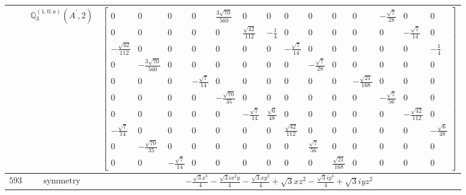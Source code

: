 \documentclass[fleqn,8pt,landscape]{jsarticle}
\begin{document}
\begin{longtable}{ccc}
$  $ & $ \mathbb{Q}_{3}^{(1,0;a)}(A^{\prime},2) $ & $ \begin{bmatrix} 0 & 0 & 0 & 0 & \frac{3 \sqrt{70}}{560} & 0 & 0 & 0 & 0 & 0 & 0 & - \frac{\sqrt{7}}{28} & 0 & 0 \\ 0 & 0 & 0 & 0 & 0 & \frac{\sqrt{42}}{112} & - \frac{1}{4} & 0 & 0 & 0 & 0 & 0 & - \frac{\sqrt{7}}{14} & 0 \\ - \frac{\sqrt{42}}{112} & 0 & 0 & 0 & 0 & 0 & 0 & - \frac{\sqrt{7}}{14} & 0 & 0 & 0 & 0 & 0 & - \frac{1}{4} \\ 0 & - \frac{3 \sqrt{70}}{560} & 0 & 0 & 0 & 0 & 0 & 0 & - \frac{\sqrt{7}}{28} & 0 & 0 & 0 & 0 & 0 \\ 0 & 0 & 0 & - \frac{\sqrt{7}}{14} & 0 & 0 & 0 & 0 & 0 & 0 & - \frac{\sqrt{21}}{168} & 0 & 0 & 0 \\ 0 & 0 & 0 & 0 & - \frac{\sqrt{70}}{35} & 0 & 0 & 0 & 0 & 0 & 0 & - \frac{\sqrt{7}}{56} & 0 & 0 \\ 0 & 0 & 0 & 0 & 0 & - \frac{\sqrt{7}}{14} & \frac{\sqrt{6}}{48} & 0 & 0 & 0 & 0 & 0 & - \frac{\sqrt{42}}{112} & 0 \\ - \frac{\sqrt{7}}{14} & 0 & 0 & 0 & 0 & 0 & 0 & \frac{\sqrt{42}}{112} & 0 & 0 & 0 & 0 & 0 & - \frac{\sqrt{6}}{48} \\ 0 & - \frac{\sqrt{70}}{35} & 0 & 0 & 0 & 0 & 0 & 0 & \frac{\sqrt{7}}{56} & 0 & 0 & 0 & 0 & 0 \\ 0 & 0 & - \frac{\sqrt{7}}{14} & 0 & 0 & 0 & 0 & 0 & 0 & \frac{\sqrt{21}}{168} & 0 & 0 & 0 & 0 \end{bmatrix} $ \\ \hline
$ 593 $ & $ \text{symmetry} $ & $ - \frac{\sqrt{3} x^{3}}{4} - \frac{\sqrt{3} i x^{2} y}{4} - \frac{\sqrt{3} x y^{2}}{4} + \sqrt{3} x z^{2} - \frac{\sqrt{3} i y^{3}}{4} + \sqrt{3} i y z^{2} $ \\

\end{longtable}
\end{document}
